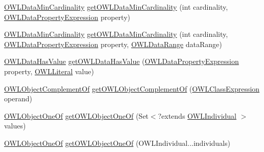 \begin{DoxyCompactItemize}
\item 
\hyperlink{interfaceorg_1_1semanticweb_1_1owlapi_1_1model_1_1_o_w_l_data_min_cardinality}{O\-W\-L\-Data\-Min\-Cardinality} \hyperlink{interfaceorg_1_1semanticweb_1_1owlapi_1_1model_1_1_o_w_l_data_factory_a532c272c85668a020ff65346c6c3497a}{get\-O\-W\-L\-Data\-Min\-Cardinality} (int cardinality, \hyperlink{interfaceorg_1_1semanticweb_1_1owlapi_1_1model_1_1_o_w_l_data_property_expression}{O\-W\-L\-Data\-Property\-Expression} property)
\item 
\hyperlink{interfaceorg_1_1semanticweb_1_1owlapi_1_1model_1_1_o_w_l_data_min_cardinality}{O\-W\-L\-Data\-Min\-Cardinality} \hyperlink{interfaceorg_1_1semanticweb_1_1owlapi_1_1model_1_1_o_w_l_data_factory_a5fa0c2e9e97f617688d4dc6fd1d07cb9}{get\-O\-W\-L\-Data\-Min\-Cardinality} (int cardinality, \hyperlink{interfaceorg_1_1semanticweb_1_1owlapi_1_1model_1_1_o_w_l_data_property_expression}{O\-W\-L\-Data\-Property\-Expression} property, \hyperlink{interfaceorg_1_1semanticweb_1_1owlapi_1_1model_1_1_o_w_l_data_range}{O\-W\-L\-Data\-Range} data\-Range)
\item 
\hyperlink{interfaceorg_1_1semanticweb_1_1owlapi_1_1model_1_1_o_w_l_data_has_value}{O\-W\-L\-Data\-Has\-Value} \hyperlink{interfaceorg_1_1semanticweb_1_1owlapi_1_1model_1_1_o_w_l_data_factory_a1c6189e001ffc7189d118f72bec413e8}{get\-O\-W\-L\-Data\-Has\-Value} (\hyperlink{interfaceorg_1_1semanticweb_1_1owlapi_1_1model_1_1_o_w_l_data_property_expression}{O\-W\-L\-Data\-Property\-Expression} property, \hyperlink{interfaceorg_1_1semanticweb_1_1owlapi_1_1model_1_1_o_w_l_literal}{O\-W\-L\-Literal} value)
\item 
\hyperlink{interfaceorg_1_1semanticweb_1_1owlapi_1_1model_1_1_o_w_l_object_complement_of}{O\-W\-L\-Object\-Complement\-Of} \hyperlink{interfaceorg_1_1semanticweb_1_1owlapi_1_1model_1_1_o_w_l_data_factory_ad778dd95923fd5b28c99f425702e6247}{get\-O\-W\-L\-Object\-Complement\-Of} (\hyperlink{interfaceorg_1_1semanticweb_1_1owlapi_1_1model_1_1_o_w_l_class_expression}{O\-W\-L\-Class\-Expression} operand)
\item 
\hyperlink{interfaceorg_1_1semanticweb_1_1owlapi_1_1model_1_1_o_w_l_object_one_of}{O\-W\-L\-Object\-One\-Of} \hyperlink{interfaceorg_1_1semanticweb_1_1owlapi_1_1model_1_1_o_w_l_data_factory_ae43ebc735a04b32e1f397c0576e1227b}{get\-O\-W\-L\-Object\-One\-Of} (Set$<$?extends \hyperlink{interfaceorg_1_1semanticweb_1_1owlapi_1_1model_1_1_o_w_l_individual}{O\-W\-L\-Individual} $>$ values)
\item 
\hyperlink{interfaceorg_1_1semanticweb_1_1owlapi_1_1model_1_1_o_w_l_object_one_of}{O\-W\-L\-Object\-One\-Of} \hyperlink{interfaceorg_1_1semanticweb_1_1owlapi_1_1model_1_1_o_w_l_data_factory_adffbd4455e32615b6a5eeba2a775f4ba}{get\-O\-W\-L\-Object\-One\-Of} (O\-W\-L\-Individual...\-individuals)

\end{DoxyCompactItemize}
